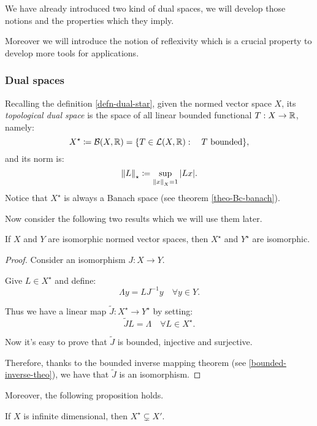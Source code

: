 We have already introduced two kind of dual spaces, we will develop those notions and the properties which they imply. 

Moreover we will introduce the notion of reflexivity which is a crucial property to develop more tools for applications.

\subsubsection{Dual spaces}
Recalling the definition \vref{defn-dual-star}, given the normed vector space $X$, its \emph{topological dual space} is the space of all linear bounded functional $T: X \to \mathbb R$, namely:
$$
	X^\star
	\coloneqq \mathcal B(X,\mathbb R) 
	= \{T\in\mathcal L(X, \mathbb R): \quad T \text{ bounded}\}
,
$$
and its norm is:
$$
	\left\lVert L\right\rVert_\star 
	\coloneqq \sup_{\left\lVert x\right\rVert_X=1} |Lx|
.
$$
Notice that $X^\star$ is always a Banach space (see theorem \vref{theo-Bc-banach}).

Now consider the following two results which we will use them later.

\begin{prop}\label{x-y-isomorphic-dual}
	If $X$ and $Y$ are isomorphic normed vector spaces, then $X^\star$ and $Y^\star$ are isomorphic.
\end{prop}
\begin{proof}
	Consider an isomorphism $J: X \to Y$.
	
	Give $L \in X^\star$ and define:
	$$\Lambda y = L J^{-1} y \quad \forall y \in Y.$$
	
	Thus we have a linear map $\tilde J: X^\star \to Y^\star$ by setting:
	$$\tilde J L = \Lambda \quad \forall L \in X^\star.$$
	
	Now it's easy to prove that $\tilde J$ is bounded, injective and surjective.
	
	Therefore, thanks to the bounded inverse mapping theorem (see \vref{bounded-inverse-theo}), we have that $\tilde J$ is an isomorphism.	
\end{proof}

Moreover, the following proposition holds.
\begin{prop}
	If $X$ is infinite dimensional, then $X^\star \subsetneq X'$.
\end{prop}

